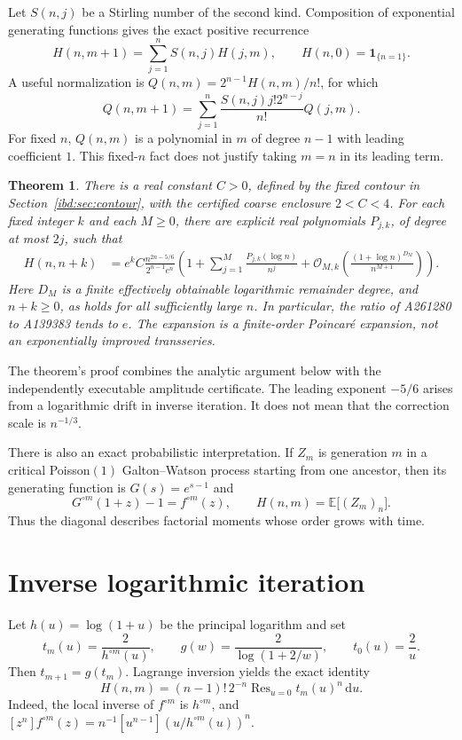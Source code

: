 \documentclass[11pt,letterpaper]{article}
\newtheorem{theorem}{Theorem}[section]
\theoremstyle{remark}\newtheorem{remark}[theorem]{Remark}
\DeclareMathOperator{\Res}{Res}
\newcommand{\dd}{\,\mathrm d}
\newcommand{\Oh}{\mathcal O}
\begin{document}
Let $S(n,j)$ be a Stirling number of the second kind. Composition of exponential generating functions gives the exact positive recurrence
\begin{equation}\label{ibd:eq:rec}
 H(n,m+1)=\sum_{j=1}^n S(n,j)H(j,m),\qquad H(n,0)=\mathbf1_{\{n=1\}}.
\end{equation}
A useful normalization is $Q(n,m)=2^{n-1}H(n,m)/n!$, for which
\[
 Q(n,m+1)=\sum_{j=1}^n\frac{S(n,j)j!2^{n-j}}{n!}Q(j,m).
\]
For fixed $n$, $Q(n,m)$ is a polynomial in $m$ of degree $n-1$ with leading coefficient $1$. This fixed-$n$ fact does not justify taking $m=n$ in its leading term.

\begin{theorem}\label{ibd:thm:main}
There is a real constant $C>0$, defined by the fixed contour in Section~\ref{ibd:sec:contour}, with the certified coarse enclosure $2<C<4$. For each fixed integer $k$ and each $M\geq0$, there are explicit real polynomials $P_{j,k}$, of degree at most $2j$, such that
\begin{align}\label{ibd:eq:main}
 H(n,n+k)&=e^k C\frac{n^{2n-5/6}}{2^{n-1}e^n}
 \left(1+\sum_{j=1}^M\frac{P_{j,k}(\log n)}{n^j}
 +\Oh_{M,k}\!\left(\frac{(1+\log n)^{D_M}}{n^{M+1}}\right)\right).
\end{align}
Here $D_M$ is a finite effectively obtainable logarithmic remainder degree, and $n+k\geq0$, as holds for all sufficiently large $n$. In particular, the ratio of A261280 to A139383 tends to $e$. The expansion is a finite-order Poincar\'e expansion, not an exponentially improved transseries.
\end{theorem}
The theorem's proof combines the analytic argument below with the independently executable amplitude certificate. The leading exponent $-5/6$ arises from a logarithmic drift in inverse iteration. It does not mean that the correction scale is $n^{-1/3}$.

There is also an exact probabilistic interpretation. If $Z_m$ is generation $m$ in a critical Poisson$(1)$ Galton--Watson process starting from one ancestor, then its generating function is $G(s)=e^{s-1}$ and
\[
 G^{\circ m}(1+z)-1=f^{\circ m}(z),\qquad
 H(n,m)=\mathbb E\bigl[(Z_m)_n\bigr].
\]
Thus the diagonal describes factorial moments whose order grows with time.

\section{Inverse logarithmic iteration}\label{ibd:sec:inviter}
Let $h(u)=\log(1+u)$ be the principal logarithm and set
\[
 t_m(u)=\frac2{h^{\circ m}(u)},\qquad
 g(w)=\frac2{\log(1+2/w)},\qquad t_0(u)=\frac2u.
\]
Then $t_{m+1}=g(t_m)$. Lagrange inversion yields the exact identity
\begin{equation}\label{ibd:eq:residue}
 H(n,m)=(n-1)!\,2^{-n}\Res_{u=0}t_m(u)^n\dd u.
\end{equation}
Indeed, the local inverse of $f^{\circ m}$ is $h^{\circ m}$, and
$[z^n]f^{\circ m}(z)=n^{-1}[u^{n-1}](u/h^{\circ m}(u))^n$.
\end{document}
